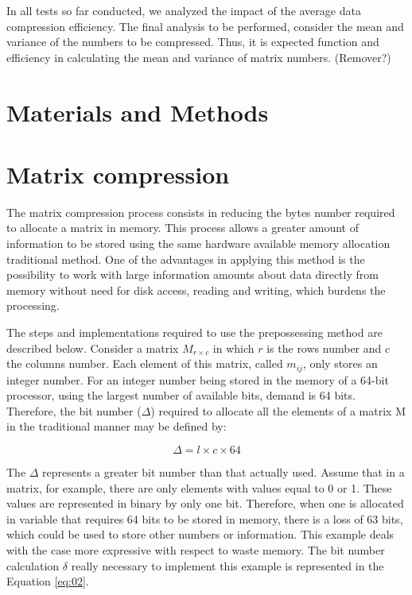 \documentclass[10pt]{article}
\begin{document}
In all tests so far conducted, we analyzed the impact of the average data compression efficiency. The final analysis to be performed, consider the mean and variance of the numbers to be compressed. Thus, it is expected function and efficiency in calculating the mean and variance of matrix numbers. (Remover?)

\section*{Materials and Methods}

\section{Matrix compression}

The matrix compression process consists in reducing the bytes number required to allocate a matrix in memory. This process allows a greater amount of information to be stored using the same hardware available memory allocation traditional method. One of the advantages in applying this method is the possibility to work with large information amounts about data directly from memory without need for disk access, reading and writing, which burdens the processing.

The steps and implementations required to use the prepossessing method are described below. Consider a matrix $M_{r \times c}$ in which $r$ is the rows number and $c$ the columns number. Each element of this matrix, called $m_{ij}$, only stores an integer number. For an integer number being stored in the memory of a 64-bit processor, using the largest number of available bits, demand is 64 bits. Therefore, the bit number ($\Delta$) required to allocate all the elements of a matrix M in the traditional manner may be defined by:

\begin{equation}\label{eq:01}
  \Delta = l \times c \times 64
\end{equation}

The $\Delta$ represents a greater bit number than that actually used. Assume that in a matrix, for example, there are only elements with values ​​equal to 0 or 1. These values ​​are represented in binary by only one bit. Therefore, when one is allocated in variable that requires 64 bits to be stored in memory, there is a loss of 63 bits, which could be used to store other numbers or information. This example deals with the case more expressive with respect to waste memory. The bit number calculation $\delta$ really necessary to implement this example is represented in the Equation \ref{eq:02}.
\end{document}
